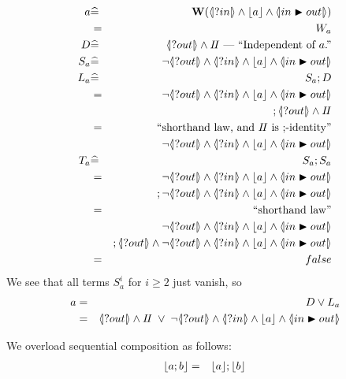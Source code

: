 \begin{eqnarray*}
   a &\defs& \W( \LS{in} \land \ado a \land \LUPD{in}{out} )
\\ &=& W_a
\\ D &\defs& \D \EOLC{Independent of $a$.}
\\ S_a &\defs& \lnot \LS{out}
               \land \LS{in} \land \ado a \land \LUPD{in}{out}
\\ L_a &\defs& S_a ; D
\\ &=& \lnot \LS{out}
               \land \LS{in} \land \ado a \land \LUPD{in}{out}
\\ && {} ; \LS{out} \land \Skip
\EQ{shorthand law, and $\Skip$ is $;$-identity}
\\ && \lnot \LS{out}
               \land \LS{in} \land \ado a \land \LUPD{in}{out}
\\ T_a &\defs& S_a ; S_a
\\ &=& \lnot \LS{out}
               \land \LS{in} \land \ado a \land \LUPD{in}{out}
\\ && {} ; \lnot \LS{out}
               \land \LS{in} \land \ado a \land \LUPD{in}{out}
\EQ{shorthand law}
\\ && \lnot \LS{out}
               \land \LS{in} \land \ado a \land \LUPD{in}{out}
\\ && {} ; \LS{out} \land \lnot \LS{out}
               \land \LS{in} \land \ado a \land \LUPD{in}{out}
\\ &=& false
\end{eqnarray*}
We see that all terms $S_a^i$ for $i \geq 2$ just vanish, so
\begin{eqnarray*}
   a &=& D \lor L_a
\\ &=& \D \;\lor\; \lnot \LS{out}
               \land \LS{in} \land \ado a \land \LUPD{in}{out}
\end{eqnarray*}


We overload sequential composition as follows:
\begin{eqnarray*}
   \lfloor a;b\rfloor &=& \lfloor a\rfloor ; \lfloor b\rfloor
\end{eqnarray*}

